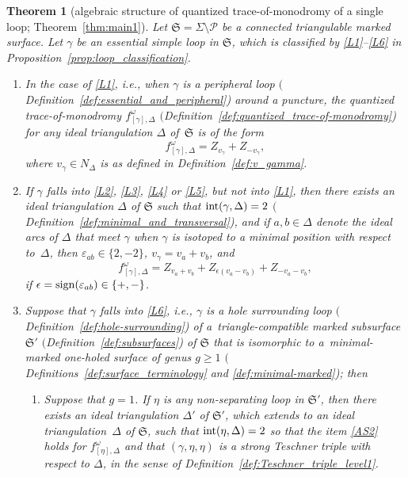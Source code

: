 \documentclass[10pt,a4paper]{amsart}
\numberwithin{equation}{section}
\newtheorem{Theorem}{Theorem}[section]
\theoremstyle{definition}
\begin{document}
\begin{Theorem}[algebraic structure of quantized trace-of-monodromy of a single loop; Theorem~\ref{thm:main1}]
\label{thm:AS}
Let $\mathfrak{S} = \Sigma\setminus\mathcal{P}$ be a connected triangulable marked surface. Let $\gamma$ be an essential simple loop in $\mathfrak{S}$, which is classified by \ref{L1}--\ref{L6} in Proposition~{\rm \ref{prop:loop_classification}}.
\begin{enumerate}[label={\rm (AS\arabic*)}]\itemsep=0pt\setlength{\leftskip}{0.22cm}
\item\label{AS1} In the case of \ref{L1}, i.e., when $\gamma$ is a peripheral loop $($Definition~{\rm \ref{def:essential_and_peripheral})} around a puncture, the quantized trace-of-monodromy $f^\omega_{[\gamma],\Delta}$ $($Definition~{\rm \ref{def:quantized_trace-of-monodromy})} for any ideal triangulation $\Delta$ of~$\mathfrak{S}$ is of the form
\[
f^\omega_{[\gamma],\Delta} = Z_{v_\gamma} + Z_{-v_\gamma},
\]
where $v_\gamma \in N_\Delta$ is as defined in Definition~{\rm \ref{def:v_gamma}}.
\item\label{AS2} If $\gamma$ falls into \ref{L2}, \ref{L3}, \ref{L4} or \ref{L5}, but not into \ref{L1}, then there exists an ideal triangulation $\Delta$ of $\mathfrak{S}$ such that ${\rm int}(\gamma,\Delta)=2$ $($Definition~{\rm \ref{def:minimal_and_transversal})}, and if $a,b \in \Delta$ denote the ideal arcs of $\Delta$ that meet $\gamma$ when $\gamma$ is isotoped to a minimal position with respect to~$\Delta$, then $\varepsilon_{ab} \in \{2,-2\}$, $v_\gamma = v_a + v_b$, and
\[
f^\omega_{[\gamma],\Delta} = Z_{v_a+v_b} + Z_{\epsilon(v_a - v_b)} + Z_{-v_a-v_b},
\]
if $\epsilon = {\rm sign}(\varepsilon_{ab}) \in \{+,-\}$.
\item\label{AS3} Suppose that $\gamma$ falls into \ref{L6}, i.e., $\gamma$ is a hole surrounding loop $($Definition~{\rm \ref{def:hole-surrounding})} of a~triangle-compatible marked subsurface $\mathfrak{S}'$ $($Definition~{\rm \ref{def:subsurfaces})} of $\mathfrak{S}$ that is isomorphic to a~minimal-marked one-holed surface of genus $g\ge 1$ $($Definitions~{\rm \ref{def:surface_terminology}} and {\rm \ref{def:minimal-marked})}; then
\begin{enumerate}[label={\rm (\alph*)}]\itemsep=0pt
\item Suppose that $g=1$. If $\eta$ is any non-separating loop in $\mathfrak{S}'$, then there exists an ideal triangulation $\Delta'$ of $\mathfrak{S}'$, which extends to an ideal triangulation~$\Delta$ of $\mathfrak{S}$, such that ${\rm int}(\eta,\Delta)=2$ so that the item \ref{AS2} holds for $f^\omega_{[\eta],\Delta}$ and that $(\gamma,\eta,\eta)$ is a strong Teschner triple with respect to $\Delta$, in the sense of Definition~{\rm \ref{def:Teschner_triple_level1}}.

\end{enumerate}
\end{enumerate}
\end{Theorem}
\end{document}
